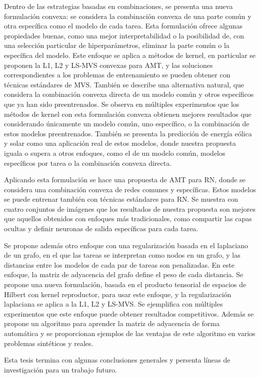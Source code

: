 \documentclass[a4paper, 11pt]{Thesis}  %
\begin{document}
{{Dentro de las estrategias basadas en combinaciones, se presenta una nueva formulación convexa: se considera la combinación convexa de una parte común y otra específica como el modelo de cada tarea. Esta formulación ofrece algunas propiedades buenas, como una mejor interpretabilidad o la posibilidad de, con una selección particular de hiperparámetros, eliminar la parte común o la específica del modelo. Este enfoque se aplica a métodos de kernel, en particular se proponen la L1, L2 y LS-MVS convexas para AMT, y las soluciones correspondientes a los problemas de entrenamiento se pueden obtener con técnicas estándares de MVS. También se describe una alternativa natural, que considera la combinación convexa directa de un modelo común y otros específicos que ya han sido preentrenados. 
Se observa en múltiples experimentos que los métodos de kernel con esta formulación convexa obtienen mejores resultados que considerando únicamente un modelo común, uno específico, o la combinación de estos modelos preentrenados. También se presenta la predicción de energía eólica y solar como una aplicación real de estos modelos, donde nuestra propuesta iguala o supera a otros enfoques, como el de un modelo común, modelos específicos por tarea o la combinación convexa directa.

Aplicando esta formulación se hace una propuesta de AMT para RN, donde se considera una combinación convexa de redes comunes y específicas. Estos modelos se puede entrenar también con técnicas estándares para RN. Se muestra con cuatro conjuntos de imágenes que los resultados de nuestra propuesta son mejores que aquellos obtenidos con enfoques más tradicionales, como compartir las capas ocultas y definir neuronas de salida específicas para cada tarea.

Se propone además otro enfoque con una regularización basada en el laplaciano de un grafo, en el que las tareas se interpretan como nodos en un grafo, y las distancias entre los modelos de cada par de tareas son penalizadas. En este enfoque, la matriz de adyacencia del grafo define el peso de cada distancia. Se propone una nueva formulación, basada en el producto tensorial de espacios de Hilbert con kernel reproductor, para usar este enfoque, y la regularización laplaciana se aplica a la L1, L2 y LS-MVS. Se ejemplifica con múltiples experimentos que este enfoque puede obtener resultados competitivos. Además se propone un algoritmo para aprender la matriz de adyacencia de forma automática y se proporcionan ejemplos de las ventajas de este algoritmo en varios problemas sintéticos y reales.

Esta tesis termina con algunas conclusiones generales y persenta líneas de investigación para un trabajo futuro.
}
}
\clearpage  %
\end{document}

